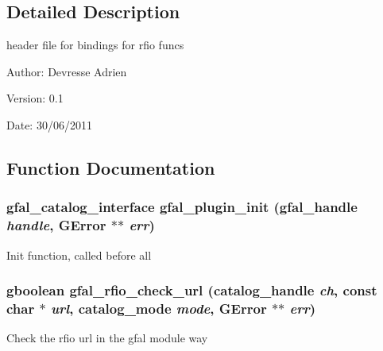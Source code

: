 \subsection{Detailed Description}
header file for bindings for rfio funcs 

\begin{Desc}
\item[Author:]Devresse Adrien \end{Desc}
\begin{Desc}
\item[Version:]0.1 \end{Desc}
\begin{Desc}
\item[Date:]30/06/2011 \end{Desc}


\subsection{Function Documentation}
\subsubsection{\setlength{\rightskip}{0pt plus 5cm}gfal\_\-catalog\_\-interface gfal\_\-plugin\_\-init (gfal\_\-handle {\em handle}, GError $\ast$$\ast$ {\em err})}\label{gfal__rfio__plugin__main_8c_5c9edde4d67d96432a319d940a4799f1}


Init function, called before all 
\subsubsection{\setlength{\rightskip}{0pt plus 5cm}gboolean gfal\_\-rfio\_\-check\_\-url (catalog\_\-handle {\em ch}, const char $\ast$ {\em url}, catalog\_\-mode {\em mode}, GError $\ast$$\ast$ {\em err})}\label{gfal__rfio__plugin__main_8c_4ccb47b2adefd1e120cf7bc297c7ddc6}


Check the rfio url in the gfal module way 